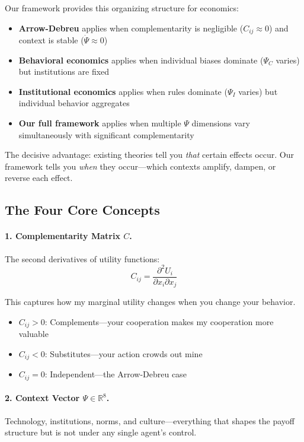 \documentclass[12pt,a4paper]{article}
\begin{document}
Our framework provides this organizing structure for economics:

\begin{itemize}
    \item \textbf{Arrow-Debreu} applies when complementarity is negligible ($C_{ij} \approx 0$) and context is stable ($\dot{\Psi} \approx 0$)
    \item \textbf{Behavioral economics} applies when individual biases dominate ($\Psi_C$ varies) but institutions are fixed
    \item \textbf{Institutional economics} applies when rules dominate ($\Psi_I$ varies) but individual behavior aggregates
    \item \textbf{Our full framework} applies when multiple $\Psi$ dimensions vary simultaneously with significant complementarity
\end{itemize}

The decisive advantage: existing theories tell you \emph{that} certain effects occur. Our framework tells you \emph{when} they occur---which contexts amplify, dampen, or reverse each effect.

\subsection{The Four Core Concepts}

\paragraph{1. Complementarity Matrix $C$.}
The second derivatives of utility functions:
\begin{equation}
  C_{ij} = \frac{\partial^2 U_i}{\partial x_i \partial x_j}
\end{equation}

This captures how my marginal utility changes when you change your behavior.
\begin{itemize}
  \item $C_{ij} > 0$: Complements---your cooperation makes my cooperation more valuable
  \item $C_{ij} < 0$: Substitutes---your action crowds out mine
  \item $C_{ij} = 0$: Independent---the Arrow-Debreu case
\end{itemize}

\paragraph{2. Context Vector $\Psi \in \mathbb{R}^8$.}
Technology, institutions, norms, and culture---everything that shapes the payoff structure but is not under any single agent's control.
\end{document}
